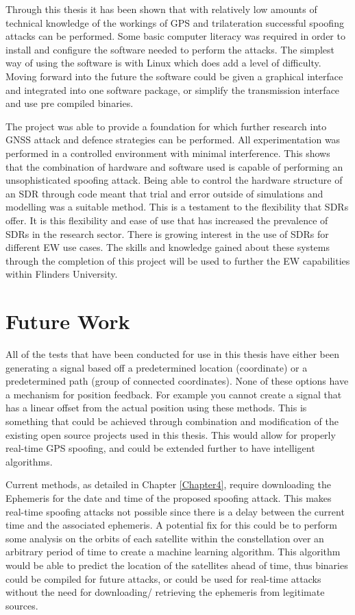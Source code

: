 \bigskip

Through this thesis it has been shown that with relatively low amounts of technical knowledge of the workings of GPS and trilateration successful spoofing attacks can be performed. Some basic computer literacy
was required in order to install and configure the software needed to perform the attacks. The simplest way of using the software is with Linux which does add a level of
difficulty.
Moving forward into the future the software could be given a graphical interface and integrated into one software package, or simplify the transmission interface and use
pre compiled binaries.

\bigskip

The project was able to provide a foundation for which further research into GNSS attack and defence strategies can be
performed. All experimentation was performed in a controlled environment with minimal interference. This shows that the combination of hardware and software used is
capable of performing an unsophisticated spoofing attack. Being able to control the hardware structure of an SDR through code meant that trial and error outside of
simulations and modelling was a suitable method.
This is a testament to the flexibility that SDRs offer. It is this flexibility and ease of use that has increased the prevalence of SDRs in the research sector. There is
growing interest in the use of SDRs for different EW use cases. The skills and knowledge gained about these systems through the completion of this project will be used
to further the EW capabilities within Flinders University.

\section{Future Work}
All of the tests that have been conducted for use in this thesis have either been generating a signal based off a predetermined location (coordinate) or a predetermined
path (group of connected coordinates). None of these options have a mechanism for position feedback. For example you cannot create a signal that has a linear offset from
the actual position using these methods. This is something that could be achieved through combination and modification of the existing open source projects used in this
thesis. This would allow for properly real-time GPS spoofing, and could be extended further to have intelligent algorithms.

Current methods, as detailed in Chapter \ref{Chapter4}, require downloading the Ephemeris for the date and time of the proposed spoofing attack. This makes real-time spoofing
attacks not possible since there is a delay between the current time and the associated ephemeris. A potential fix for this could be to perform some analysis on the
orbits of each satellite within the constellation over an arbitrary period of time to create a machine learning algorithm. This algorithm would be able to predict the
location of the satellites ahead of time, thus binaries could be compiled for future attacks, or could be used for real-time attacks without the need for downloading/
retrieving the ephemeris from legitimate sources.

